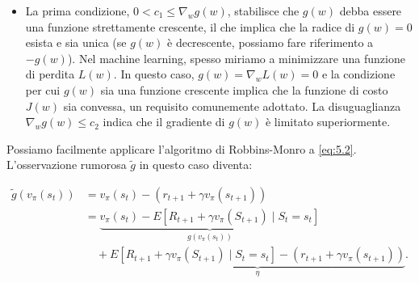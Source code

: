 ﻿\documentclass[11pt, a4paper]{report}
\begin{document}
\begin{center}
{\begin{minipage}{0.95\textwidth}
\begin{itemize}
    \item La prima condizione, $0 < c_1 \le \nabla_w g(w)$, stabilisce che $g(w)$ debba essere una funzione strettamente crescente, il che implica che la radice di $g(w) = 0$ esista e sia unica (se $g(w)$ è decrescente, possiamo fare riferimento a $-g(w)$). Nel machine learning, spesso miriamo a minimizzare una funzione di perdita $L(w)$. In questo caso, $g(w) = \nabla_w L(w) = 0$ e la condizione per cui $g(w)$ sia una funzione crescente implica che la funzione di costo $J(w)$ sia convessa, un requisito comunemente adottato. La disuguaglianza $\nabla_w g(w) \le c_2$ indica che il gradiente di $g(w)$ è limitato superiormente.
\end{itemize}
\vspace{0.1cm}
\end{minipage}
}
\end{center}

\newpage

\begin{center}
\end{center}

Possiamo facilmente applicare l'algoritmo di Robbins-Monro a \eqref{eq:5.2}. L'osservazione rumorosa $\tilde{g}$ in questo caso diventa:

\begin{align*}
\tilde{g}(v_\pi(s_t)) &= v_\pi(s_t) - (r_{t+1} + \gamma v_\pi(s_{t+1})) \\
&= \underbrace{v_\pi(s_t) - E[R_{t+1} + \gamma v_\pi(S_{t+1}) \mid S_t = s_t]}_{g(v_\pi(s_t))} \\
&\quad + \underbrace{E[R_{t+1} + \gamma v_\pi(S_{t+1}) \mid S_t = s_t] - (r_{t+1} + \gamma v_\pi(s_{t+1}))}_{\eta}. \tag{5.4}
\end{align*}
\end{document}
